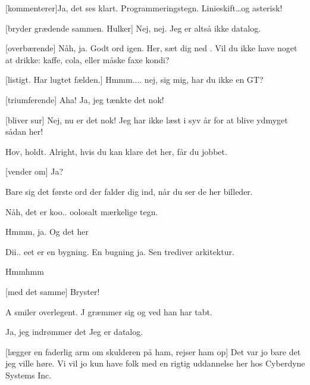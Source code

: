 \documentclass[a4paper,11pt]{article}
\begin{document}
\begin{sketch}
  [kommenterer]Ja, det ses klart. Programmeringstegn.
   Linieskift\ldots og asterisk!
  
  [bryder grædende sammen. Hulker] Nej, nej. Jeg er altså ikke
  datalog.
  
  [overbærende] Nåh, ja. Godt ord igen. Her, sæt dig ned
  . Vil du ikke have noget at drikke:
  kaffe, cola, eller måske faxe kondi?
  
  [listigt. Har lugtet fælden.] Hmmm.... nej, sig mig, har du
  ikke en GT?
  
  [triumferende] Aha! Ja, jeg tænkte det nok!
  
  [bliver sur] Nej, nu er det nok!  Jeg
  har ikke læst i syv år for at blive ydmyget sådan her! 
  
   Hov, holdt. Alright, hvis du kan klare det her, får du
  jobbet.
  
  [vender om] Ja?
  
   Bare sig det første ord der falder dig ind, når du ser de
  her billeder. 
  
   Nåh, det er koo.. oolosalt mærkelige
  tegn.
  
   Hmmm, ja. Og det her 
  
   Dii.. eet er en bygning. En
  bugning ja. Sen trediver arkitektur.
  
   Hmmhmm 
  
  [med det samme] Bryster!
  
  \scene A smiler overlegent. J græmmer sig og ved han har tabt.
  
   Ja, jeg indrømmer det  Jeg er datalog.
  
  [lægger en faderlig arm om skulderen på ham, rejser ham op]
  Det var jo bare det jeg ville høre. Vi vil jo kun have folk med en
  rigtig uddannelse her hos Cyberdyne Systems Inc.

\end{sketch}
\end{document}

